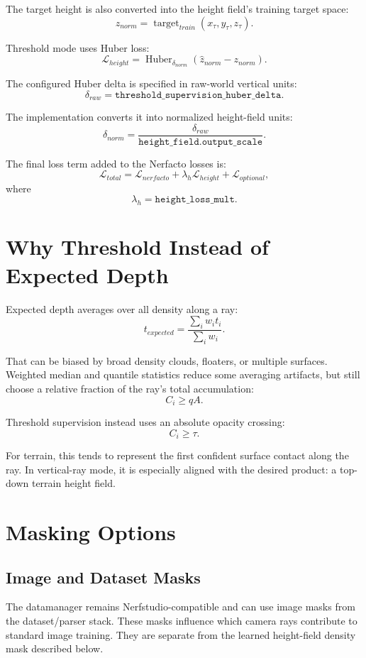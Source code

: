 \documentclass[11pt]{article}
\begin{document}
The target height is also converted into the height field's training target space:
\[
  z_{norm} = \operatorname{target}_{train}(x_{\tau},y_{\tau},z_{\tau}).
\]

Threshold mode uses Huber loss:
\[
  \mathcal{L}_{height}
  =
  \operatorname{Huber}_{\delta_{norm}}
  \left(
    \hat{z}_{norm} - z_{norm}
  \right).
\]

The configured Huber delta is specified in raw-world vertical units:
\[
  \delta_{raw} = \texttt{threshold\_supervision\_huber\_delta}.
\]

The implementation converts it into normalized height-field units:
\[
  \delta_{norm} =
  \frac{\delta_{raw}}{\texttt{height\_field.output\_scale}}.
\]

The final loss term added to the Nerfacto losses is:
\[
  \mathcal{L}_{total}
  =
  \mathcal{L}_{nerfacto}
  +
  \lambda_h \mathcal{L}_{height}
  +
  \mathcal{L}_{optional},
\]
where
\[
  \lambda_h = \texttt{height\_loss\_mult}.
\]

\section{Why Threshold Instead of Expected Depth}

Expected depth averages over all density along a ray:
\[
  t_{expected} =
  \frac{\sum_i w_i t_i}{\sum_i w_i}.
\]

That can be biased by broad density clouds, floaters, or multiple surfaces. Weighted median and quantile statistics reduce some averaging artifacts, but still choose a relative fraction of the ray's total accumulation:
\[
  C_i \ge qA.
\]

Threshold supervision instead uses an absolute opacity crossing:
\[
  C_i \ge \tau.
\]

For terrain, this tends to represent the first confident surface contact along the ray. In vertical-ray mode, it is especially aligned with the desired product: a top-down terrain height field.

\section{Masking Options}

\subsection{Image and Dataset Masks}

The datamanager remains Nerfstudio-compatible and can use image masks from the dataset/parser stack. These masks influence which camera rays contribute to standard image training. They are separate from the learned height-field density mask described below.
\end{document}
